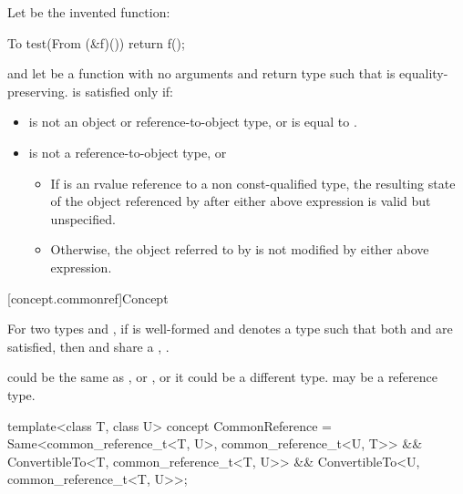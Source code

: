 \begin{itemdescr}
\pnum
Let  be the invented function:
\begin{codeblock}
To test(From (&f)()) {
  return f();
}
\end{codeblock}
and let  be a function with no arguments and return type 
such that  is equality-preserving.
 is satisfied only if:

\begin{itemize}
\item
{} is not an object or reference-to-object type, or
 is equal to .

\item
{} is not a reference-to-object type, or

\begin{itemize}
\item
If  is an rvalue reference to a non const-qualified type, the
resulting state of the object referenced by  after either above
expression is valid but unspecified.

\item
Otherwise, the object referred to by  is not modified by either above
expression.
\end{itemize}
\end{itemize}
\end{itemdescr}


[concept.commonref]{Concept }

\pnum
For two types  and , if 
is well-formed and denotes a type  such that both
and
are satisfied, then  and  share a
, .
\begin{note}
 could be the same as , or , or it could be a
different type.  may be a reference type.
\end{note}

%
\begin{itemdecl}
template<class T, class U>
  concept CommonReference =
    Same<common_reference_t<T, U>, common_reference_t<U, T>> &&
    ConvertibleTo<T, common_reference_t<T, U>> &&
    ConvertibleTo<U, common_reference_t<T, U>>;
\end{itemdecl}

